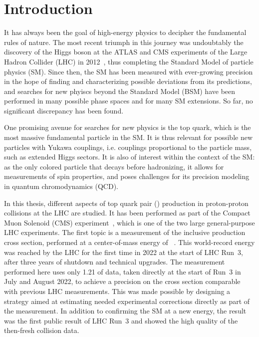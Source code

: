 \chapter{Introduction}
\label{ch:intro}


It has always been the goal of high-energy physics to decipher the fundamental rules of nature. The most recent triumph in this journey was undoubtably the discovery of the Higgs boson at the ATLAS and CMS experiments of the Large Hadron Collider (LHC) in 2012~\cite{ATLAS:2012tfa,CMS:HIG-12-028,CMS:HIG-12-036}, thus completing the Standard Model of particle physics (SM). Since then, the SM has been measured with ever-growing precision in the hope of finding and characterizing possible deviations from its predictions, and searches for new phyiscs beyond the Standard Model (BSM) have been performed in many possible phase spaces and for many SM extensions. So far, no significant discrepancy has been found.

One promising avenue for searches for new physics is the top quark, which is the most massive fundamental particle in the SM. It is thus relevant for possible new particles with Yukawa couplings, i.e. couplings proportional to the particle mass, such as extended Higgs sectors. It is also of interest within the context of the SM: as the only colored particle that decays before hadronizing, it allows for measurements of spin properties, and poses challenges for its precision modeling in quantum chromodynamics (QCD). 

\medskip

In this thesis, different aspects of top quark pair (\ttbar) production in proton-proton collisions at the LHC are studied. It has been performed as part of the Compact Muon Solenoid (CMS) experiment~\cite{CMS:2008xjf}, which is one of the two large general-purpose LHC experiments. The first topic is a measurement of the inclusive \ttbar production cross section, performed at a center-of-mass energy of \sqrtsRIII~\cite{CMS:TOP-22-012}. This world-record energy was reached by the LHC for the first time in 2022 at the start of LHC Run~3, after three years of shutdown and technical upgrades. The measurement performed here uses only \SI{1.21}{\fbinv} of data, taken directly at the start of Run~3 in July and August 2022, to achieve a precision on the \ttbar cross section comparable with previous LHC measurements. This was made possible by designing a strategy aimed at estimating needed experimental corrections directly as part of the measurement. In addition to confirming the SM at a new energy, the result was the first public result of LHC Run~3 and showed the high quality of the then-fresh collision data.


